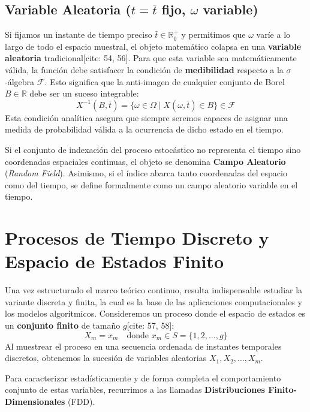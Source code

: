 \subsection{Variable Aleatoria ($t = \bar{t}$ fijo, $\omega$ variable)}
Si fijamos un instante de tiempo preciso $\bar{t} \in \mathbb{R}_0^+$ y permitimos que $\omega$ varíe a lo largo de todo el espacio muestral, el objeto matemático colapsa en una \textbf{variable aleatoria} tradicional[cite: 54, 56]. Para que esta variable sea matemáticamente válida, la función debe satisfacer la condición de \textbf{medibilidad} respecto a la $\sigma$-álgebra $\mathcal{F}$. Esto significa que la anti-imagen de cualquier conjunto de Borel $B \in \mathbb{R}$ debe ser un suceso integrable:
\begin{equation}
    X^{-1}(B, \bar{t}) = \{ \omega \in \Omega \mid X(\omega, \bar{t}) \in B \} \in \mathcal{F}
\end{equation}
Esta condición analítica asegura que siempre seremos capaces de asignar una medida de probabilidad válida a la ocurrencia de dicho estado en el tiempo.

\begin{observacion}
    Si el conjunto de indexación del proceso estocástico no representa el tiempo sino coordenadas espaciales continuas, el objeto se denomina \textbf{Campo Aleatorio} (\textit{Random Field}). Asimismo, si el índice abarca tanto coordenadas del espacio como del tiempo, se define formalmente como un campo aleatorio variable en el tiempo.
\end{observacion}

\section{Procesos de Tiempo Discreto y Espacio de Estados Finito}

Una vez estructurado el marco teórico continuo, resulta indispensable estudiar la variante discreta y finita, la cual es la base de las aplicaciones computacionales y los modelos algorítmicos. Consideremos un proceso donde el espacio de estados es un \textbf{conjunto finito} de tamaño $g$[cite: 57, 58]:
\begin{equation}
    X_m = x_m \quad \text{donde } x_m \in S = \{1, 2, \dots, g\}
\end{equation}
Al muestrear el proceso en una secuencia ordenada de instantes temporales discretos, obtenemos la sucesión de variables aleatorias $X_1, X_2, \dots, X_m$. 

Para caracterizar estadísticamente y de forma completa el comportamiento conjunto de estas variables, recurrimos a las llamadas \textbf{Distribuciones Finito-Dimensionales} (FDD).

